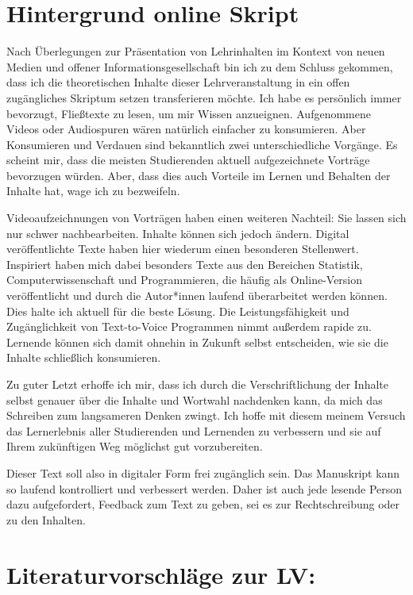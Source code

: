 \documentclass[
  letterpaper,
  DIV=11,
  numbers=noendperiod]{scrreprt}
\begin{document}

\chapter{Hintergrund online Skript}\label{sec-hintergrund_script}

Nach Überlegungen zur Präsentation von Lehrinhalten im Kontext von neuen
Medien und offener Informationsgesellschaft bin ich zu dem Schluss
gekommen, dass ich die theoretischen Inhalte dieser Lehrveranstaltung in
ein offen zugängliches Skriptum setzen transferieren möchte. Ich habe es
persönlich immer bevorzugt, Fließtexte zu lesen, um mir Wissen
anzueignen. Aufgenommene Videos oder Audiospuren wären natürlich
einfacher zu konsumieren. Aber Konsumieren und Verdauen sind bekanntlich
zwei unterschiedliche Vorgänge. Es scheint mir, dass die meisten
Studierenden aktuell aufgezeichnete Vorträge bevorzugen würden. Aber,
dass dies auch Vorteile im Lernen und Behalten der Inhalte hat, wage ich
zu bezweifeln.

Videoaufzeichnungen von Vorträgen haben einen weiteren Nachteil: Sie
lassen sich nur schwer nachbearbeiten. Inhalte können sich jedoch
ändern. Digital veröffentlichte Texte haben hier wiederum einen
besonderen Stellenwert. Inspiriert haben mich dabei besonders Texte aus
den Bereichen Statistik, Computerwissenschaft und Programmieren, die
häufig als Online-Version veröffentlicht und durch die Autor*innen
laufend überarbeitet werden können. Dies halte ich aktuell für die beste
Lösung. Die Leistungsfähigkeit und Zugänglichkeit von Text-to-Voice
Programmen nimmt außerdem rapide zu. Lernende können sich damit ohnehin
in Zukunft selbst entscheiden, wie sie die Inhalte schließlich
konsumieren.

Zu guter Letzt erhoffe ich mir, dass ich durch die Verschriftlichung der
Inhalte selbst genauer über die Inhalte und Wortwahl nachdenken kann, da
mich das Schreiben zum langsameren Denken zwingt. Ich hoffe mit diesem
meinem Versuch das Lernerlebnis aller Studierenden und Lernenden zu
verbessern und sie auf Ihrem zukünftigen Weg möglichst gut
vorzubereiten.

Dieser Text soll also in digitaler Form frei zugänglich sein. Das
Manuskript kann so laufend kontrolliert und verbessert werden. Daher ist
auch jede lesende Person dazu aufgefordert, Feedback zum Text zu geben,
sei es zur Rechtschreibung oder zu den Inhalten.


\chapter{Literaturvorschläge zur
LV:}\label{literaturvorschluxe4ge-zur-lv}
\end{document}
